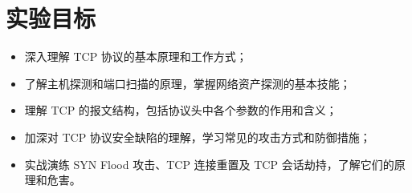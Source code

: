 \section{实验目标}
\begin{itemize}
\item 深⼊理解 TCP 协议的基本原理和⼯作⽅式；
\item 了解主机探测和端⼝扫描的原理，掌握⽹络资产探测的基本技能；
\item 理解 TCP 的报⽂结构，包括协议头中各个参数的作⽤和含义；
\item 加深对 TCP 协议安全缺陷的理解，学习常⻅的攻击⽅式和防御措施；
\item 实战演练 SYN Flood 攻击、TCP 连接重置及 TCP 会话劫持，了解它们的原理和危害。
\end{itemize}

